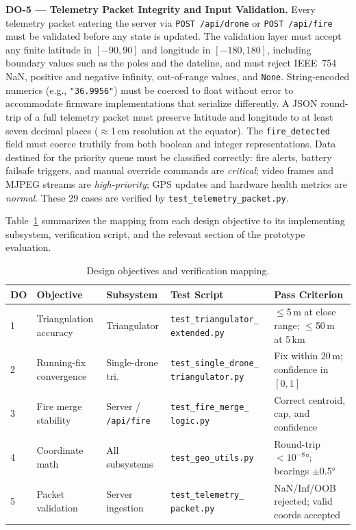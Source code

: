 \documentclass[journal, onecolumn]{IEEEtran}
\begin{document}
\textbf{DO-5 — Telemetry Packet Integrity and Input Validation.}
Every telemetry packet entering the server via \texttt{POST /api/drone} or \texttt{POST /api/fire} must be validated before any state is updated. The validation layer must accept any finite latitude in $[-90, 90]$ and longitude in $[-180, 180]$, including boundary values such as the poles and the dateline, and must reject IEEE~754 NaN, positive and negative infinity, out-of-range values, and \texttt{None}. String-encoded numerics (e.g., \texttt{"36.9956"}) must be coerced to float without error to accommodate firmware implementations that serialize differently. A JSON round-trip of a full telemetry packet must preserve latitude and longitude to at least seven decimal places ($\approx$1\,cm resolution at the equator). The \texttt{fire\_detected} field must coerce truthily from both boolean and integer representations. Data destined for the priority queue must be classified correctly: fire alerts, battery failsafe triggers, and manual override commands are \textit{critical}; video frames and MJPEG streams are \textit{high-priority}; GPS updates and hardware health metrics are \textit{normal}. These 29 cases are verified by \texttt{test\_telemetry\_packet.py}.

\vspace{0.75em}

Table~\ref{tab:design_objectives} summarizes the mapping from each design objective to its implementing subsystem, verification script, and the relevant section of the prototype evaluation.

\begin{table}[H]
    \centering
    \small
    \begin{tabular}{|p{}|p{}|p{}|p{}|p{}|}
        \hline
        \textbf{DO} & \textbf{Objective} & \textbf{Subsystem} & \textbf{Test Script} & \textbf{Pass Criterion} \\
        \hline
        1 & Triangulation accuracy & Triangulator & \texttt{test\_triangulator\_
extended.py}& $\leq$5\,m at close range; $\leq$50\,m at 5\,km \\
        \hline
        2 & Running-fix convergence & Single-drone tri. & \texttt{test\_single\_drone\_
triangulator.py}& Fix within 20\,m; confidence in $[0,1]$ \\
        \hline
        3 & Fire merge stability & Server / \texttt{/api/fire} & \texttt{test\_fire\_merge\_
logic.py}& Correct centroid, cap, and confidence \\
        \hline
        4 & Coordinate math & All subsystems & \texttt{test\_geo\_utils.py} & Round-trip $<10^{-8}°$; bearings $\pm$0.5° \\
        \hline
        5 & Packet validation & Server ingestion & \texttt{test\_telemetry\_
packet.py}& NaN/Inf/OOB rejected; valid coords accepted \\
        \hline
    \end{tabular}
    \caption{Design objectives and verification mapping.}
    \label{tab:design_objectives}
\end{table}
\end{document}
